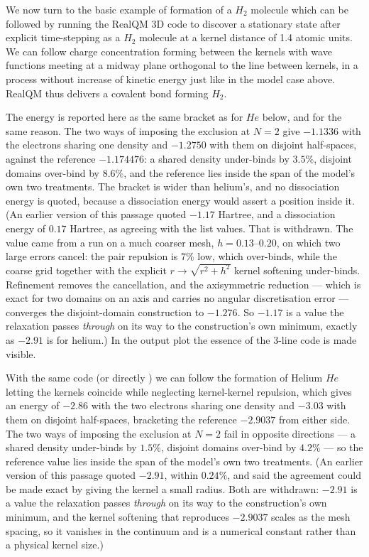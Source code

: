 \documentclass[11pt]{article} %
\begin{document}
We now turn to the basic example of formation of a $H_2$ molecule which can be followed by running the RealQM 3D code \cite{H2code} to discover a stationary state after explicit time-stepping as a $H_2$ molecule at a kernel distance of 1.4 atomic units.  We can follow charge concentration forming between the kernels with wave functions meeting at a midway plane orthogonal to the line between kernels,  in a process without increase of kinetic energy just like in the model case above.  RealQM thus delivers a covalent bond forming $H_2$.

The energy is reported here as the same bracket as for $He$ below, and for the same reason.  The two ways of imposing the exclusion at $N=2$ give $-1.1336$ with the electrons sharing one density and $-1.2750$ with them on disjoint half-spaces, against the reference $-1.174476$:  a shared density under-binds by $3.5\%$, disjoint domains over-bind by $8.6\%$, and the reference lies inside the span of the model's own two treatments.  The bracket is wider than helium's, and no dissociation energy is quoted, because a dissociation energy would assert a position inside it.  (An earlier version of this passage quoted $-1.17$ Hartree, and a dissociation energy of $0.17$ Hartree, as agreeing with the list values.  That is withdrawn.  The value came from a run on a much coarser mesh, $h=0.13$--$0.20$, on which two large errors cancel:  the pair repulsion is $7\%$ low, which over-binds, while the coarse grid together with the explicit $r\to\sqrt{r^2+h^2}$ kernel softening under-binds.  Refinement removes the cancellation, and the axisymmetric reduction --- which is exact for two domains on an axis and carries no angular discretisation error --- converges the disjoint-domain construction to $-1.276$.  So $-1.17$ is a value the relaxation passes \emph{through} on its way to the construction's own minimum, exactly as $-2.91$ is for helium.)  In the output plot the essence of the 3-line code is made visible. 

With the same code (or directly \cite{Heliumcode}) we can follow the formation of Helium $He$ letting the kernels coincide while neglecting kernel-kernel repulsion,  which gives an energy of $-2.86$ with the two electrons sharing one density and $-3.03$ with them on disjoint half-spaces, bracketing the reference $-2.9037$ from either side.  The two ways of imposing the exclusion at $N=2$ fail in opposite directions --- a shared density under-binds by $1.5\%$, disjoint domains over-bind by $4.2\%$ --- so the reference value lies inside the span of the model's own two treatments.  (An earlier version of this passage quoted $-2.91$, within $0.24\%$, and said the agreement could be made exact by giving the kernel a small radius.  Both are withdrawn: $-2.91$ is a value the relaxation passes \emph{through} on its way to the construction's own minimum, and the kernel softening that reproduces $-2.9037$ scales as the mesh spacing, so it vanishes in the continuum and is a numerical constant rather than a physical kernel size.) 
\end{document}
